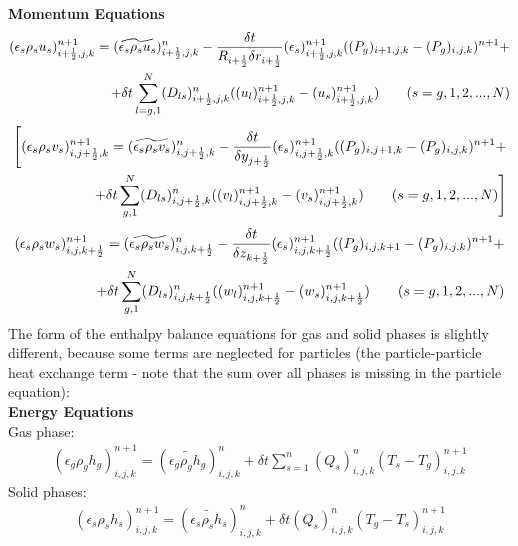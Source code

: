 {\bf Momentum Equations}\\
%
\begin{eqnarray}
\htmlimage{}
(\epsilon_s \rho_s u_s)_{i+\frac{1}{2},j,k}^{n+1} =
(\widetilde{\epsilon_s \rho_s u_s})_{i+\frac{1}{2},j,k}^{n} -
\frac{\delta t}{R_{i+\frac{1}{2}}\delta r_{i+\frac{1}{2}}} 
(\epsilon_s)_{i+\frac{1}{2},j,k}^{n+1}
((P_g)_{i+1,j,k} - (P_g)_{i,j,k})^{n+1} + \nonumber \\
+\delta t \sum_{l=g,1}^{N} (D_{ls})^n_{i+\frac{1}{2},j,k}
((u_l)_{i+\frac{1}{2},j,k}^{n+1} - (u_s)_{i+\frac{1}{2},j,k}^{n+1})
\qquad (s=g,1,2,...,N)
\nonumber
\end{eqnarray}
%
\begin{eqnarray}
\htmlimage{}
\Bigg[
(\epsilon_s \rho_s v_s)_{i,j+\frac{1}{2},k}^{n+1} =
(\widetilde{\epsilon_s \rho_s v_s})_{i,j+\frac{1}{2},k}^{n} -
\frac{\delta t}{\delta y_{j+\frac{1}{2}}} (\epsilon_s)_{i,j+\frac{1}{2},k}^{n+1}
((P_g)_{i,j+1,k} - (P_g)_{i,j,k})^{n+1} + 
\nonumber \\ 
+ \delta t \sum_{g,1}^{N} (D_{ls})^n_{i,j+\frac{1}{2},k}
((v_l)_{i,j+\frac{1}{2},k}^{n+1} - (v_s)_{i,j+\frac{1}{2},k}^{n+1})
\qquad (s=g,1,2,...,N)
\Bigg]
\nonumber
\end{eqnarray}
%
\begin{eqnarray}
\htmlimage{}
(\epsilon_s \rho_s w_s)_{i,j,k+\frac{1}{2}}^{n+1} =
(\widetilde{\epsilon_s \rho_s w_s})_{i,j,k+\frac{1}{2}}^{n} -
\frac{\delta t}{\delta z_{k+\frac{1}{2}}} (\epsilon_s)_{i,j,k+\frac{1}{2}}^{n+1}
((P_g)_{i,j,k+1} - (P_g)_{i,j,k})^{n+1} + \nonumber \\
+ \delta t \sum_{g,1}^{N} (D_{ls})^n_{i,j,k+\frac{1}{2}}
((w_l)_{i,j,k+\frac{1}{2}}^{n+1} - (w_s)_{i,j,k+\frac{1}{2}}^{n+1})
\qquad (s=g,1,2,...,N)
\nonumber
\end{eqnarray}
%
The form of the enthalpy balance equations for gas and solid phases is 
slightly different, because some terms are neglected for particles
(the particle-particle heat exchange term - note that the sum over
all phases is missing in the particle equation):\\


{\bf Energy Equations}\\
%
Gas phase:
%
\begin{eqnarray}
(\epsilon_g \rho_g h_g)_{i,j,k}^{n+1} = 
(\widetilde{\epsilon_g \rho_g h_g})^n_{i,j,k} +
\delta t \sum_{s=1}^{n} (Q_s)_{i,j,k}^{n} (T_s - T_g)_{i,j,k}^{n+1}
\nonumber
\end{eqnarray}
%
Solid phases:
%
\begin{eqnarray}
(\epsilon_s \rho_s h_s)_{i,j,k}^{n+1} = 
(\widetilde{\epsilon_s \rho_s h_s})^n_{i,j,k} +
\delta t  (Q_s)_{i,j,k}^{n} (T_g - T_s)_{i,j,k}^{n+1}
\nonumber
\end{eqnarray}
%
\newpage
%
